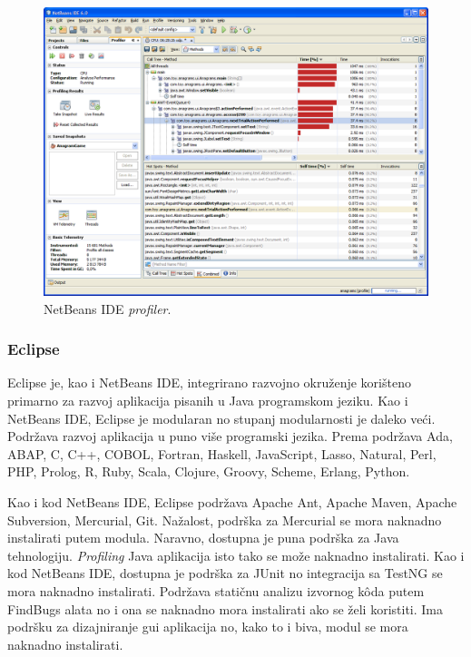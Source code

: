 \begin{figure}[!htbp]
    \caption{NetBeans IDE \emph{profiler}.}
    \label{fig:netbeans_ide_profiler}
    \centering
    \includegraphics[max width=\textwidth]{images/netbeans_ide_profiler.png}
\end{figure}

\subsubsection{Eclipse}
Eclipse je, kao i NetBeans IDE, integrirano razvojno okruženje korišteno primarno za razvoj aplikacija pisanih u Java programskom jeziku. Kao i NetBeans IDE, Eclipse je modularan no stupanj modularnosti je daleko veći. Podržava razvoj aplikacija u puno više programski jezika. Prema\cite{eclipsesoftware} podržava Ada, ABAP, C, C++, COBOL, Fortran, Haskell, JavaScript, Lasso, Natural, Perl, PHP, Prolog, R, Ruby, Scala, Clojure, Groovy, Scheme, Erlang, Python.

Kao i kod NetBeans IDE, Eclipse podržava Apache Ant, Apache Maven, Apache Subversion, Mercurial, Git. Nažalost, podrška za Mercurial se mora naknadno instalirati putem modula. Naravno, dostupna je puna podrška za Java tehnologiju. \emph{Profiling} Java aplikacija isto tako se može naknadno instalirati. Kao i kod NetBeans IDE, dostupna je podrška za JUnit no integracija sa TestNG se mora naknadno instalirati. Podržava statičnu analizu izvornog kôda putem FindBugs alata no i ona se naknadno mora instalirati ako se želi koristiti. Ima podršku za dizajniranje \gls{gui} aplikacija no, kako to i biva, modul se mora naknadno instalirati.

